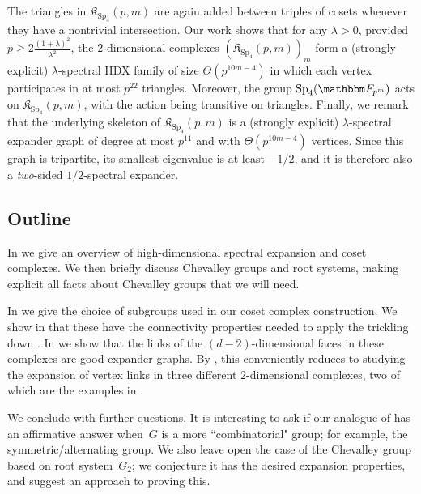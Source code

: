 \documentclass[10pt,a4paper]{article}
\theoremstyle{definition}
\newcommand{\F}{\mathbbm F}
\newcommand{\SP}{{\mathrm{Sp}}}
\newcommand{\complex}{\mathfrak{K}}
\begin{document}
The triangles in $\complex_{\SP_4}(p,m)$ are again added between triples of cosets whenever they have a nontrivial intersection.
Our work shows that for any $\lambda > 0$, provided~$p \geq 2\frac{(1+\lambda)^2}{\lambda^2}$, the $2$-dimensional complexes $(\complex_{\SP_4}(p,m))_{m}$ form a (strongly explicit) $\lambda$-spectral HDX family of size $\Theta(p^{10m-4})$ in which each vertex participates in at most $p^{22}$ triangles.
Moreover, the group $\SP_4(\F_{p^m})$ acts on $\complex_{\SP_4}(p,m)$, with the action being transitive on triangles.
Finally, we remark that the underlying skeleton of $\complex_{\SP_4}(p,m)$ is a (strongly explicit) $\lambda$-spectral expander graph of degree at most $p^{11}$ and with $\Theta(p^{10m-4})$ vertices.
Since this graph is tripartite, its smallest eigenvalue is at least $-1/2$, and it is therefore also a \emph{two}-sided $1/2$-spectral expander.


\subsection{Outline}
In  we give an overview of high-dimensional spectral expansion and coset complexes. We then briefly discuss Chevalley groups and root systems, making explicit all facts about Chevalley groups that we will need.

In  we give the choice of subgroups used in our coset complex construction. We show in  that these have the connectivity properties needed to apply the trickling down . In  we show that the links of the $(d-2)$-dimensional faces in these complexes are good expander graphs. By , this conveniently reduces to studying the expansion of vertex links in three different $2$-dimensional complexes, two of which are the examples in .

We conclude with further questions. It is interesting to ask if our analogue of  has an affirmative answer when~$G$ is a more ``combinatorial" group; for example, the symmetric/alternating group. We also leave open the case of the Chevalley group based on root system~$G_2$; we conjecture it has the desired expansion properties, and suggest an approach to proving this.
\end{document}
